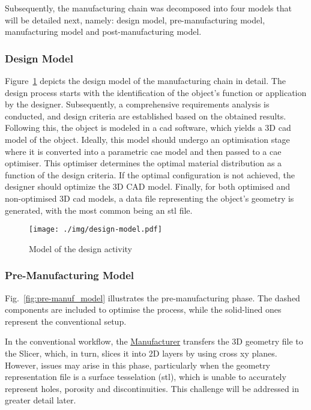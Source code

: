 Subsequently, the manufacturing chain was decomposed into four models that will be
detailed next, namely: design model, pre-manufacturing model, manufacturing
model and post-manufacturing model.

\subsubsection{Design Model}
Figure~\ref{fig:design_model} depicts the design model of the manufacturing
chain in detail. The design process starts with the identification of the object's function or application by the designer. Subsequently, a comprehensive requirements analysis is conducted, and design criteria are established based on the obtained results. Following this, the object is modeled in a \gls{cad} software, which yields a 3D \gls{cad} model of the object. Ideally, this model should undergo an optimisation stage where it is converted into a parametric \gls{cae} model and then passed to a \gls{cae} optimiser. This optimiser determines the optimal material distribution as a function of the design criteria. If the optimal configuration is not achieved, the designer should optimize the 3D CAD model. Finally, for both optimised and non-optimised 3D \gls{cad} models, a data file representing the object's geometry is generated, with the most common being an \gls{stl} file.

%
\begin{figure}[!hbt]
\centering
  \texttt{[image: ./img/design-model.pdf]}
%
  \caption{Model of the design activity}%
\label{fig:design_model}
\end{figure}

%
\subsubsection{Pre-Manufacturing Model}
Fig.~\ref{fig:pre-manuf_model} illustrates the pre-manufacturing
phase. The dashed components are included to optimise the process, while the
solid-lined ones represent the conventional setup.

In the conventional workflow, the \underline{Manufacturer} transfers the 3D
geometry file to the Slicer, which, in turn, slices it into 2D layers by using
cross xy planes. However, issues may arise in this phase, particularly when the
geometry representation file is a surface tesselation (\gls{stl}), which is unable to accurately represent holes, porosity and discontinuities. This challenge will be addressed in greater detail later.

